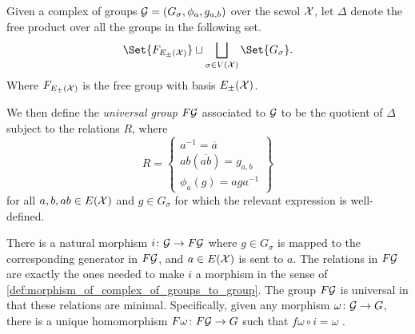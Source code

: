 \begin{definition}
	Given a complex of groups $\mathcal{G} = (G_\sigma, \phi_a, g_{a,b})$ over the scwol $\mathcal{X}$, let $\Delta$ denote the free product over all the groups in the following set.
	\[
		\Set{F_{E_\pm(\calx)}} \sqcup \bigsqcup_{\sigma \in V(\calx)}\Set{G_\sigma}
		.\]
	Where $F_{E_\pm(\mathcal{X})}$ is the free group with basis  $E_\pm(\mathcal{X})$.

	We then define the \emph{universal group} $F\mathcal{G}$ associated to $\mathcal{G}$ to be the quotient of $\Delta$ subject to the relations  $R$, where
	\[
		R = \left\{
		\begin{array}{l}
			a^{-1}   = \overline{a}     \\
			ab(\overline{ab}) = g_{a,b} \\
			\phi_a(g)    = aga^{-1}
		\end{array}
		\right\}
	\]
	for all $a,b,ab \in E(\mathcal{X})$ and $g \in G_\sigma$ for which the relevant expression is well-defined.
	\label{def:complex_of_groups_universal_group}
\end{definition}
There is a natural morphism $i \colon \mathcal{G} \to F\mathcal{G}$ where $g \in G_\sigma$ is mapped to the corresponding generator in $F\mathcal{G}$, and  $a \in E(\mathcal{X})$ is sent to $a$.
The relations in $F\mathcal{G}$ are exactly the ones needed to make  $i$ a morphism in the sense of \cref{def:morphism_of_complex_of_groups_to_group}.
The group $F\mathcal{G}$ is universal in that these relations are minimal.
Specifically, given any morphism $\omega \colon \mathcal{G} \to G$, there is a unique homomorphism $F\omega \colon F\mathcal{G} \to G$ such that $f\omega \circ i = \omega$ \cite[Chapter 3.\textrm{\ensuremath{\calc}}, Section 3.2]{BrHa11}.

